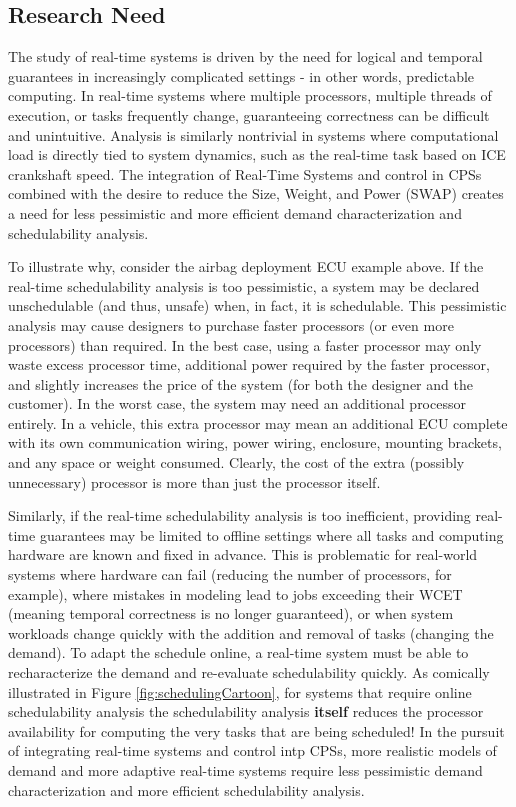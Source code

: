 \subsection{Research Need}
The study of real-time systems is driven by the need for logical and temporal guarantees in increasingly complicated settings - in other words, predictable computing.
In real-time systems where multiple processors, multiple threads of execution, or tasks frequently change, guaranteeing correctness can be difficult and unintuitive.
Analysis is similarly nontrivial in systems where computational load is directly tied to system dynamics, such as the real-time task based on ICE crankshaft speed.
The integration of Real-Time Systems and control in CPSs combined with the desire to reduce the Size, Weight, and Power (SWAP) creates a need for less pessimistic and more efficient demand characterization and schedulability analysis.

To illustrate why, consider the airbag deployment ECU example above.
If the real-time schedulability analysis is too pessimistic, a system may be declared unschedulable (and thus, unsafe) when, in fact, it is schedulable.
This pessimistic analysis may cause designers to purchase faster processors (or even more processors) than required.
In the best case, using a faster processor may only waste excess processor time, additional power required by the faster processor, and slightly increases the price of the system (for both the designer and the customer).
In the worst case, the system may need an additional processor entirely.
In a vehicle, this extra processor may mean an additional ECU complete with its own communication wiring, power wiring, enclosure, mounting brackets, and any space or weight consumed.
Clearly, the cost of the extra (possibly unnecessary) processor is more than just the processor itself.

Similarly, if the real-time schedulability analysis is too inefficient, providing real-time guarantees may be limited to offline settings where all tasks and computing hardware are known and fixed in advance.
This is problematic for real-world systems where hardware can fail (reducing the number of processors, for example), where mistakes in modeling lead to jobs exceeding their WCET (meaning temporal correctness is no longer guaranteed), or when system workloads change quickly with the addition and removal of tasks (changing the demand).
To adapt the schedule online, a real-time system must be able to recharacterize the demand and re-evaluate schedulability quickly.
As comically illustrated in Figure \ref{fig:schedulingCartoon}, for systems that require online schedulability analysis the schedulability analysis \textbf{itself} reduces the processor availability for computing the very tasks that are being scheduled!
In the pursuit of integrating real-time systems and control intp CPSs, more realistic models of demand and more adaptive real-time systems require less pessimistic demand characterization and more efficient schedulability analysis.

